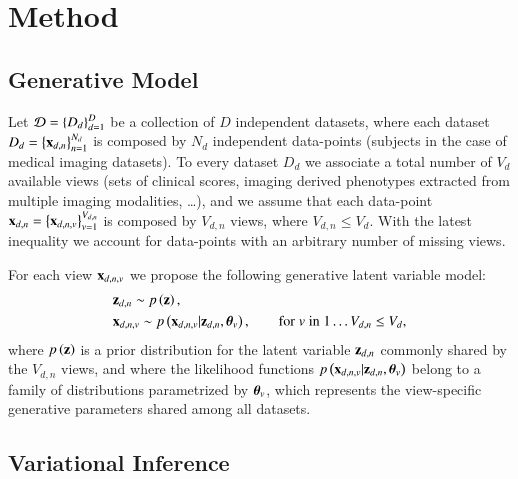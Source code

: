 \section{Method}
\label{sec:method}

\subsection{Generative Model}
Let $\mathcal{D} = \left\{D_d\right\}_{d=1}^D$ be a collection of $D$ independent datasets, where each dataset $D_d = \left\{\mathbf{x}_{d,n}\right\}_{n=1}^{N_d}$ is composed by $N_d$ independent data-points (\eg subjects in the case of medical imaging datasets).
To every dataset $D_d$ we associate a total number of $V_d$ available views
(\eg sets of clinical scores, imaging derived phenotypes extracted from multiple imaging modalities, \ldots),
and we assume that each data-point $\mathbf{x}_{d,n} = \left\{\mathbf{x}_{d,n,v}\right\}_{v=1}^{V_{d,n}}$ is composed by $V_{d,n}$ views,
where $V_{d,n} \leq V_d$.
With the latest inequality we account for data-points with an arbitrary number of missing views.

For each view $\mathbf{x}_{d,n,v}$ we propose the following generative latent variable model:
\begin{equation}\label{eq:model}
\begin{aligned}
&\z_{d,n} \sim \p{\z}, \\  %
&\xdnv \sim \p{\xdnv|\z_{d,n},\thetab_v},  %
\qquad \textnormal {for} \; v \; \textnormal{in} \; 1 \ldots V_{d,n} \leq V_d,
\end{aligned}
\end{equation}
where $p\left(\mathbf{z}\right)$ is a prior distribution for the latent variable $\mathbf{z}_{d,n}$ commonly shared by the $V_{d,n}$ views, and
where the likelihood functions $p\left(\mathbf{x}_{d,n,v}|\mathbf{z}_{d,n},\boldsymbol{\theta}_v\right)$ belong to a family of distributions parametrized by $\boldsymbol{\theta}_v$, which represents the view-specific generative parameters shared among all datasets.

\subsection{Variational Inference}

